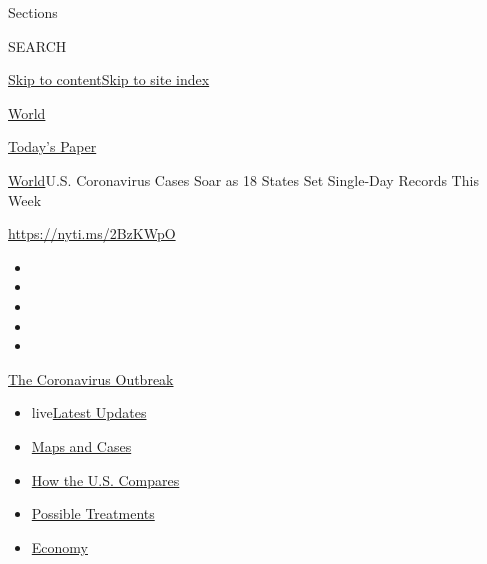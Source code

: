 Sections

SEARCH

\protect\hyperlink{site-content}{Skip to
content}\protect\hyperlink{site-index}{Skip to site index}

\href{https://www.nytimes3xbfgragh.onion/section/world}{World}

\href{https://myaccount.nytimes3xbfgragh.onion/auth/login?response_type=cookie\&client_id=vi}{}

\href{https://www.nytimes3xbfgragh.onion/section/todayspaper}{Today's
Paper}

\href{/section/world}{World}\textbar{}U.S. Coronavirus Cases Soar as 18
States Set Single-Day Records This Week

\url{https://nyti.ms/2BzKWpO}

\begin{itemize}
\item
\item
\item
\item
\item
\end{itemize}

\href{https://www.nytimes3xbfgragh.onion/news-event/coronavirus?action=click\&pgtype=Article\&state=default\&module=styln-coronavirus-national\&region=TOP_BANNER\&context=storylines_menu}{The
Coronavirus Outbreak}

\begin{itemize}
\tightlist
\item
  live\href{https://www.nytimes3xbfgragh.onion/2020/07/25/world/coronavirus-covid-19.html?action=click\&pgtype=Article\&state=default\&module=styln-coronavirus-national\&region=TOP_BANNER\&context=storylines_menu}{Latest
  Updates}
\item
  \href{https://www.nytimes3xbfgragh.onion/interactive/2020/us/coronavirus-us-cases.html?action=click\&pgtype=Article\&state=default\&module=styln-coronavirus-national\&region=TOP_BANNER\&context=storylines_menu}{Maps
  and Cases}
\item
  \href{https://www.nytimes3xbfgragh.onion/interactive/2020/07/23/us/coronavirus-hotspots-countries.html?action=click\&pgtype=Article\&state=default\&module=styln-coronavirus-national\&region=TOP_BANNER\&context=storylines_menu}{How
  the U.S. Compares}
\item
  \href{https://www.nytimes3xbfgragh.onion/interactive/2020/science/coronavirus-drugs-treatments.html?action=click\&pgtype=Article\&state=default\&module=styln-coronavirus-national\&region=TOP_BANNER\&context=storylines_menu}{Possible
  Treatments}
\item
  \href{https://www.nytimes3xbfgragh.onion/live/2020/07/24/business/stock-market-updates-coronavirus?action=click\&pgtype=Article\&state=default\&module=styln-coronavirus-national\&region=TOP_BANNER\&context=storylines_menu}{Economy}
\end{itemize}

